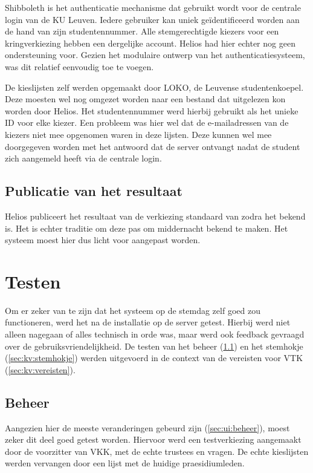 Shibboleth is het authenticatie mechanisme dat gebruikt wordt voor de centrale login van de KU Leuven. Iedere gebruiker kan uniek ge\"identificeerd worden aan de hand van zijn studentennummer. Alle stemgerechtigde kiezers voor een kringverkiezing hebben een dergelijke account. Helios had hier echter nog geen ondersteuning voor. Gezien het modulaire ontwerp van het authenticatiesysteem, was dit relatief eenvoudig toe te voegen.

\npar De kieslijsten zelf werden opgemaakt door LOKO, de Leuvense studentenkoepel. Deze moesten wel nog omgezet worden naar een bestand dat uitgelezen kon worden door Helios. Het studentennummer werd hierbij gebruikt als het unieke ID voor elke kiezer. Een probleem was hier wel dat de e-mailadressen van de kiezers niet mee opgenomen waren in deze lijsten. Deze kunnen wel mee doorgegeven worden met het antwoord dat de server ontvangt nadat de student zich aangemeld heeft via de centrale login.

\subsection{Publicatie van het resultaat}
\label{sec:kv:publicatie_van_het_resultaat}

Helios publiceert het resultaat van de verkiezing standaard van zodra het bekend is. Het is echter traditie om deze pas om middernacht bekend te maken. Het systeem moest hier dus licht voor aangepast worden.

\section{Testen}
\label{sec:kv:testen}

Om er zeker van te zijn dat het systeem op de stemdag zelf goed zou functioneren, werd het na de installatie op de server getest. Hierbij werd niet alleen nagegaan of alles technisch in orde was, maar werd ook feedback gevraagd over de gebruiksvriendelijkheid. De testen van het beheer (\ref{sec:kv:beheer}) en het stemhokje (\ref{sec:kv:stemhokje}) werden uitgevoerd in de context van de vereisten voor VTK (\ref{sec:kv:vereisten}).

\subsection{Beheer}
\label{sec:kv:beheer}

Aangezien hier de meeste veranderingen gebeurd zijn (\ref{sec:ui:beheer}), moest zeker dit deel goed getest worden. Hiervoor werd een testverkiezing aangemaakt door de voorzitter van VKK, met de echte trustees en vragen. De echte kieslijsten werden vervangen door een lijst met de huidige praesidiumleden.

